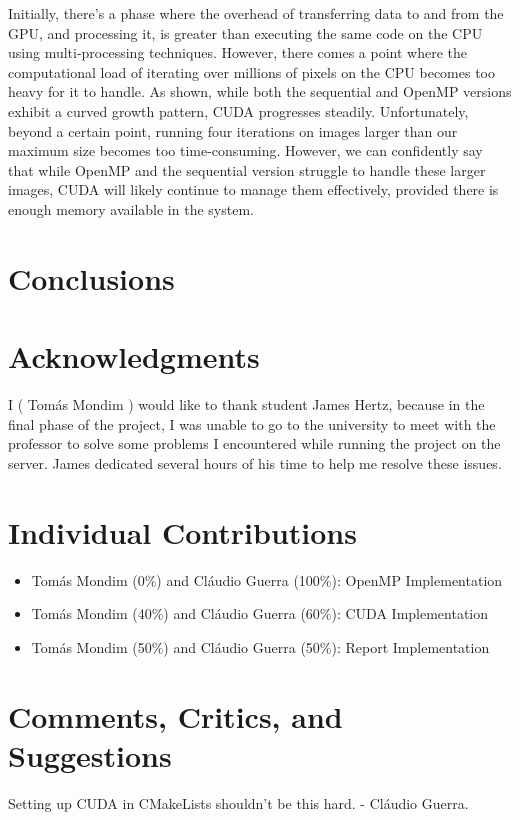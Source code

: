 \documentclass[sigconf]{acmart}
\begin{document}
Initially, there's a phase where the overhead of transferring data to and from the GPU, and processing it, is greater than executing the same code on the CPU using multi-processing techniques. However, there comes a point where the computational load of iterating over millions of pixels on the CPU becomes too heavy for it to handle. As shown, while both the sequential and OpenMP versions exhibit a curved growth pattern, CUDA progresses steadily. Unfortunately, beyond a certain point, running four iterations on images larger than our maximum size becomes too time-consuming. However, we can confidently say that while OpenMP and the sequential version struggle to handle these larger images, CUDA will likely continue to manage them effectively, provided there is enough memory available in the system.

\section{Conclusions}

\section{Acknowledgments}
I ( Tomás Mondim ) would like to thank student James Hertz, because in the final phase of the project, I was unable to go to the university to meet with the professor to solve some problems I encountered while running the project on the server. James dedicated several hours of his time to help me resolve these issues.

\section{Individual Contributions}
\begin{itemize}
    \item Tomás Mondim (0\%) and Cláudio Guerra (100\%): OpenMP Implementation
    \item Tomás Mondim (40\%) and Cláudio Guerra (60\%): CUDA Implementation
    \item Tomás Mondim (50\%) and Cláudio Guerra (50\%): Report Implementation
\end{itemize}

\section{Comments, Critics, and Suggestions}

Setting up CUDA in CMakeLists shouldn't be this hard. - Cláudio Guerra.
\end{document}
